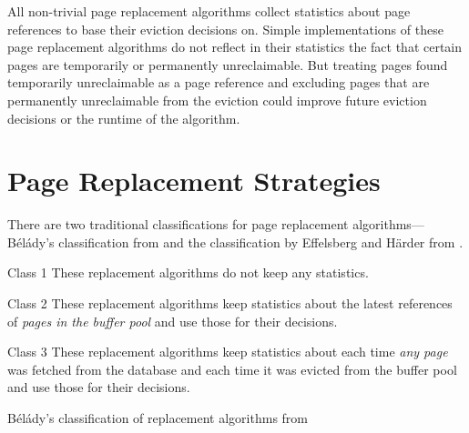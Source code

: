     All non-trivial page replacement algorithms collect statistics about page references to base their eviction decisions on. Simple implementations of these page replacement algorithms do not reflect in their statistics the fact that certain pages are temporarily or permanently unreclaimable. But treating pages found temporarily unreclaimable as a page reference and excluding pages that are permanently unreclaimable from the eviction could improve future eviction decisions or the runtime of the algorithm.

\section{Page Replacement Strategies} \label{sec:page_replacement_strategies}

    There are two traditional classifications for page replacement algorithms---Bélády's classification from \cite{Belady:1966} and the classification by Effelsberg and Härder from \cite{Effelsberg:1984}.

\begin{@empty}%
    \begin{table}[h!]
        \begin{labeleddescription}
            \item[Class 1] \label{intab:beladyclass1}  These replacement algorithms do not keep any statistics.
            \item[Class 2] \label{intab:beladyclass2}  These replacement algorithms keep statistics about the latest references of \emph{pages in the buffer pool} and use those for their decisions.
            \item[Class 3] \label{intab:beladyclass3}  These replacement algorithms keep statistics about each time \emph{any page} was fetched from the database and each time it was evicted from the buffer pool and use those for their decisions.
        \end{labeleddescription}
        \caption[Bélády's classification]{Bélády's classification of replacement algorithms from \cite{Belady:1966}}
        \label{tab:bclassification}
    \end{table}
\end{@empty}

    \pagebreak

